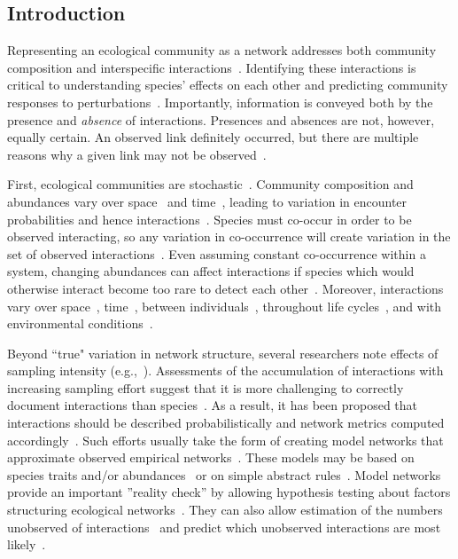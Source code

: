 \documentclass[12pt]{article}
\begin{document}
\begin{spacing}{1.5}

\clearpage

\section*{Introduction}

    Representing an ecological community as a network addresses both community composition and interspecific interactions~\citep{Roslin2016}. Identifying these interactions is critical to understanding species' effects on each other and predicting community responses to perturbations~\citep{Bartomeus2016,Giron2018}. Importantly, information is conveyed both by the presence and \emph{absence} of interactions. Presences and absences are not, however, equally certain. An observed link definitely occurred, but there are multiple reasons why a given link may not be observed~\citep{Jordano2016}. 


    First, ecological communities are stochastic~\citep{Gotelli2000}. Community composition and abundances vary over space~\citep{Baiser2012} and time~\citep{Olesen2011a}, leading to variation in encounter probabilities and hence interactions~\citep{Vazquez2005,Poisot2015}. Species must co-occur in order to be observed interacting, so any variation in co-occurrence will create variation in the set of observed interactions~\citep{Gravel2018,Graham2018}. Even assuming constant co-occurrence within a system, changing abundances can affect interactions if species which would otherwise interact become too rare to detect each other~\citep{Tylianakis2010,Jordano2016}. Moreover, interactions vary over space~\citep{Kitching1987,Baiser2012}, time~\citep{Olesen2011a,Lopez2017}, between individuals~\citep{Pires2011a,Wells2013,Fodrie2015,Novak2015}, throughout life cycles~\citep{Clegg2018}, and with environmental conditions~\citep{Poisot2015}.


    Beyond ``true" variation in network structure, several researchers note effects of sampling intensity (e.g.,~\citealp{Martinez1999,Bluthgen2006,Jordano2016}). Assessments of the accumulation of interactions with increasing sampling effort suggest that it is more challenging to correctly document interactions than species~\citep{Guimera2009,Poisot2012,Bartomeus2013,Jordano2016,Giron2018}. As a result, it has been proposed that interactions should be described probabilistically and network metrics computed accordingly~\citep{Bartomeus2013,Poisot2016}. Such efforts usually take the form of creating model networks that approximate observed empirical networks~\citep{Allesina2008,Guimera2009,Williams2010,Rohr2016}. These models may be based on species traits and/or abundances~\citep{Rohr2016,Weinstein2017a,Graham2018} or on simple abstract rules~\citep{Allesina2008,Guimera2009,Williams2010}. Model networks provide an important ''reality check'' by allowing hypothesis testing about factors structuring ecological networks~\citep{Bartomeus2013,Graham2018}. They can also allow estimation of the numbers unobserved of interactions~\citep{Jordano2016,Weinstein2017a} and predict which unobserved interactions are most likely~\citep{Guimera2009,Bartomeus2013}. 



\end{spacing}
\end{document}
